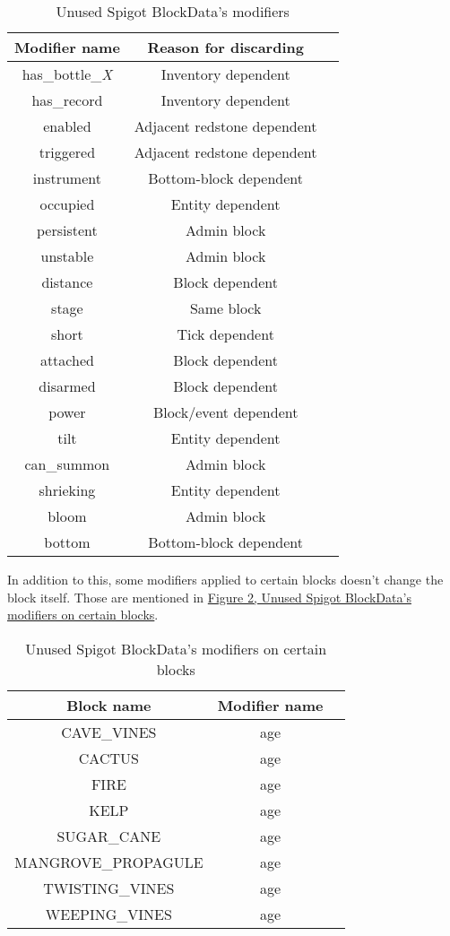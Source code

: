 \documentclass[11pt]{article}
\begin{document}
\begin{table}[h]
	\centering
	\begin{tabular}{ |c|c|c| }
		\hline
		Modifier name & Reason for discarding \\
		\hline
		has\_bottle\_\it{X} & Inventory dependent \\
		has\_record & Inventory dependent \\
		enabled & Adjacent redstone dependent \\
		triggered & Adjacent redstone dependent \\
		instrument & Bottom-block dependent \\
		occupied & Entity dependent \\
		persistent & Admin block \\
		unstable & Admin block \\
		distance & Block dependent \\
		stage & Same block \\
		short & Tick dependent \\
		attached & Block dependent \\
		disarmed & Block dependent \\
		power & Block/event dependent \\
		tilt & Entity dependent \\
		can\_summon & Admin block \\
		shrieking & Entity dependent \\
		bloom & Admin block \\
		bottom & Bottom-block dependent \\
		\hline
	\end{tabular}
	\caption{Unused Spigot BlockData's modifiers}
	\label{fig:unused-blockdata}
\end{table}

In addition to this, some modifiers applied to certain blocks doesn't change the block itself. Those are mentioned in \hyperref[fig:unused-blockdata-blocks]{Figure \ref{fig:unused-blockdata-blocks}, Unused Spigot BlockData's modifiers on certain blocks}.

\begin{table}[h]
	\centering
	\begin{tabular}{ |c|c|c| }
		\hline
		Block name & Modifier name \\
		\hline
		CAVE\_VINES & age \\
		CACTUS & age \\
		FIRE & age \\
		KELP & age \\
		SUGAR\_CANE & age \\
		MANGROVE\_PROPAGULE & age \\
		TWISTING\_VINES & age \\
		WEEPING\_VINES & age \\
		\hline
	\end{tabular}
	\caption{Unused Spigot BlockData's modifiers on certain blocks}
	\label{fig:unused-blockdata-blocks}
\end{table}
\end{document}
